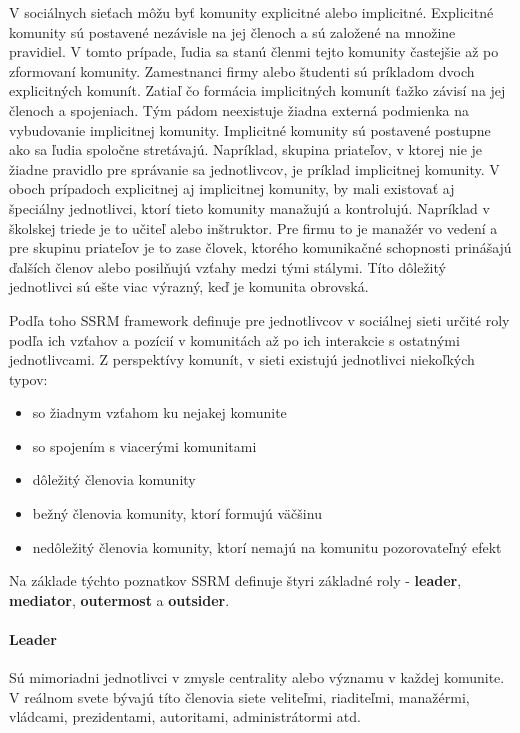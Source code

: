 \documentclass[slovak,master,public,dept460,male,cpdeclaration,oneside]{diploma}
\begin{document}
V sociálnych sieťach môžu byť komunity explicitné alebo implicitné. Explicitné komunity sú postavené nezávisle na jej členoch a sú založené na množine pravidiel. V tomto prípade, ľudia sa stanú členmi tejto komunity častejšie až po zformovaní komunity. Zamestnanci firmy alebo študenti sú príkladom dvoch explicitných komunít. Zatiaľ čo formácia implicitných komunít ťažko závisí na jej členoch a spojeniach. Tým pádom neexistuje žiadna externá podmienka na vybudovanie implicitnej komunity. Implicitné komunity sú postavené postupne ako sa ľudia spoločne stretávajú. Napríklad, skupina priateľov, v ktorej nie je žiadne pravidlo pre správanie sa jednotlivcov, je príklad implicitnej komunity. V oboch prípadoch explicitnej aj implicitnej komunity, by mali existovať aj špeciálny jednotlivci, ktorí tieto komunity manažujú a kontrolujú. Napríklad v školskej triede je to učiteľ alebo inštruktor. Pre firmu to je manažér vo vedení a pre skupinu priateľov je to zase človek, ktorého komunikačné schopnosti prinášajú ďalších členov alebo posilňujú vzťahy medzi tými stálymi. Títo dôležitý jednotlivci sú ešte viac výrazný, keď je komunita obrovská.


Podľa toho SSRM framework definuje pre jednotlivcov v sociálnej sieti určité roly podľa ich vzťahov a pozícií v komunitách až po ich interakcie s ostatnými jednotlivcami. Z perspektívy komunít, v sieti existujú jednotlivci niekoľkých typov:

\begin{itemize}
\item so žiadnym vzťahom ku nejakej komunite
\item so spojením s viacerými komunitami
\item dôležitý členovia komunity
\item bežný členovia komunity, ktorí formujú väčšinu
\item nedôležitý členovia komunity, ktorí nemajú na komunitu pozorovateľný efekt
\end{itemize} 


Na základe týchto poznatkov SSRM definuje štyri základné roly - \textbf{leader}, \textbf{mediator}, \textbf{outermost} a \textbf{outsider}.

\paragraph{Leader}
\hfill \break
Sú mimoriadni jednotlivci v zmysle centrality alebo významu v každej komunite. V reálnom svete bývajú títo členovia siete veliteľmi, riaditeľmi, manažérmi,  vládcami, prezidentami, autoritami, administrátormi atd.
\end{document}
